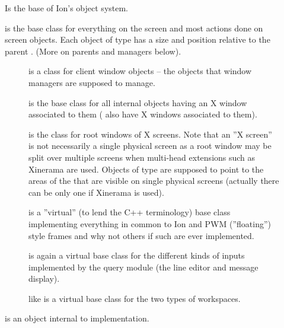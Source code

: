 \begin{description}
  \item[]
    Is the base of Ion's object system.
  \item[]
    is the base class for everything on the screen
    and most actions done on screen objects. Each object of type
      has a size and position relative to the parent
    . (More on parents and managers below).
    \begin{description}
      \item[] is a class for
	client window objects -- the objects that window managers are
	supposed to manage.
      \item[] is the base class for all
	internal objects having an X window associated to them
	( also have X windows associated to them).
	
      \item[] is the class for
	root windows of X screens.
	Note that an ''X screen'' is not necessarily a single 
	physical screen as a root window may be
	split over multiple screens when multi-head extensions such as
	Xinerama are used. 
	Objects of type  are supposed to point to the
	areas of the  that are visible on single physical
	screens (actually there can be only one  if Xinerama
	is used).
	
      \item[] is a ''virtual'' (to
	lend the C++ terminology) base class implementing everything in
	common to Ion and PWM (''floating'') style frames and why not others
	if such are ever implemented.
	
      \item[] is again a virtual base class
	for the different kinds of inputs implemented by the query module
	(the line editor and message display).
	
      \item[] like  is a
	virtual base class for the two types of workspaces.
    \end{description}
    
  \item[] is an object internal to
     implementation.
\end{description}



